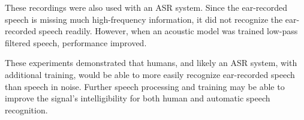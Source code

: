 These recordings were also used with an ASR system.  Since the ear-recorded speech is missing much high-frequency information, it did not recognize the ear-recorded speech readily.  However, when an acoustic model was trained low-pass filtered speech, performance improved.

These experiments demonstrated that humans, and likely an ASR system, with additional training, would be able to more easily recognize ear-recorded speech than speech in noise.  Further speech processing and training may be able to improve the signal's intelligibility for both human and automatic speech recognition.

